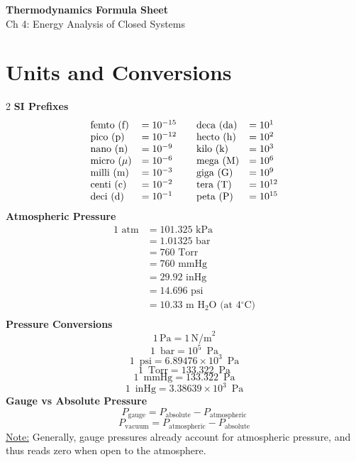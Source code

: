 \documentclass[10pt, fleqn]{article}
\begin{document}
\begin{center}
    \Large \textbf{Thermodynamics Formula Sheet} \\
    \normalsize Ch 4: Energy Analysis of Closed Systems
\end{center}
    \section*{Units and Conversions}
    \vspace{-1em}
\begin{multicols}{2}\noindent
\textbf{SI Prefixes}
\makeatletter
\@fleqnfalse
\makeatother
\[
\begin{array}{ll@{\qquad}ll}
\text{femto (f)} &= 10^{-15} & \text{deca (da)} &= 10^{1} \\
\text{pico (p)} &= 10^{-12} & \text{hecto (h)} &= 10^{2} \\
\text{nano (n)} &= 10^{-9}  & \text{kilo (k)} &= 10^{3} \\
\text{micro ($\mu$)} &= 10^{-6} & \text{mega (M)} &= 10^{6} \\
\text{milli (m)} &= 10^{-3} & \text{giga (G)} &= 10^{9} \\
\text{centi (c)} &= 10^{-2} & \text{tera (T)} &= 10^{12} \\
\text{deci (d)} &= 10^{-1}  & \text{peta (P)} &= 10^{15}
\end{array}
\]
\makeatletter
\@fleqntrue
\makeatother
\textbf{Atmospheric Pressure}
\[\begin{aligned}
1 \text{ atm} &= 101.325 \text{ kPa} \\
&= 1.01325 \text{ bar} \\
&= 760 \text{ Torr} \\
&= 760 \text{ mmHg} \\
&= 29.92 \text{ inHg} \\
&= 14.696 \text{ psi}\\
&= 10.33 \text{ m H}_2\text{O (at 4$^\circ$C)} \\
\end{aligned}\]
\textbf{Pressure Conversions}
\[1\,\text{Pa} = 1\,\text{N/m}^2\]
\[1\, \text{ bar} = 10^{5}\, \text{ Pa}\]
\[1\, \text{ psi} = 6.89476 \times 10^{3}\, \text{ Pa}\]
\[1\, \text{ Torr} = 133.322\, \text{ Pa}\]
\[1\, \text{ mmHg} = 133.322\, \text{ Pa}\]
\[1\, \text{ inHg} = 3.38639 \times 10^{3}\, \text{ Pa}\]
\textbf{Gauge vs Absolute Pressure}
\[P_{\text{gauge}} = P_{\text{absolute}} - P_{\text{atmospheric}}\]
\[P_{\text{vacuum}} = P_{\text{atmospheric}} - P_{\text{absolute}}\]
\underline{Note:} Generally, gauge pressures already account for atmospheric pressure, and thus reads zero when open to the atmosphere.\\

\end{multicols}
\end{document}
